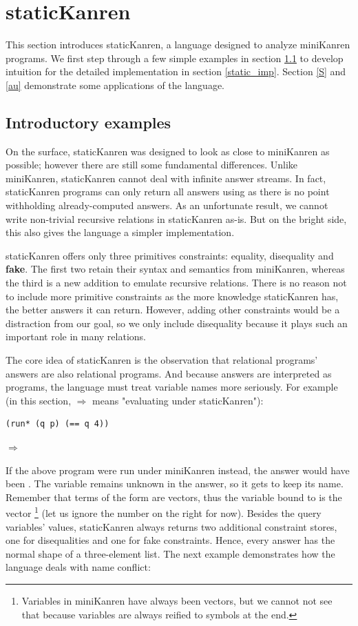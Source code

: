 \section{staticKanren}\label{static}
This section introduces staticKanren, a language designed to analyze miniKanren programs. We first step through a few simple examples in section \ref{static_intro} to develop intuition for the detailed implementation in section \ref{static_imp}. Section \ref{S} and \ref{au} demonstrate some applications of the language.

\subsection{Introductory examples}\label{static_intro}
On the surface, staticKanren was designed to look as close to miniKanren as possible; however there are still some fundamental differences. Unlike miniKanren, staticKanren cannot deal with infinite answer streams. In fact, staticKanren programs can only return all answers using  as there is no point withholding already-computed answers. As an unfortunate result, we cannot write non-trivial recursive relations in staticKanren as-is. But on the bright side, this also gives the language a simpler implementation.

staticKanren offers only three primitives constraints: equality, disequality and \textbf{fake}. The first two retain their syntax and semantics from miniKanren, whereas the third is a new addition to emulate recursive relations. There is no reason not to include more primitive constraints as the more knowledge staticKanren has, the better answers it can return. However, adding other constraints would be a distraction from our goal, so we only include disequality because it plays such an important role in many relations.

The core idea of staticKanren is the observation that relational programs' answers are also relational programs. And because answers are interpreted as programs, the language must treat variable names more seriously. For example (in this section, $\Rightarrow$ means "evaluating under staticKanren"):

\begin{lstlisting}
(run* (q p) (== q 4))
\end{lstlisting}
$\Rightarrow$ 

If the above program were run under miniKanren instead, the answer would have been . The variable  remains unknown in the answer, so it gets to keep its name. Remember that terms of the form  are vectors, thus the variable bound to  is the vector \footnote{Variables in miniKanren have always been vectors, but we cannot not see that because variables are always reified to symbols at the end.} (let us ignore the number on the right for now). Besides the query variables' values, staticKanren always returns two additional constraint stores, one for disequalities and one for fake constraints. Hence, every answer has the normal shape of a three-element list. The next example demonstrates how the language deals with name conflict:

